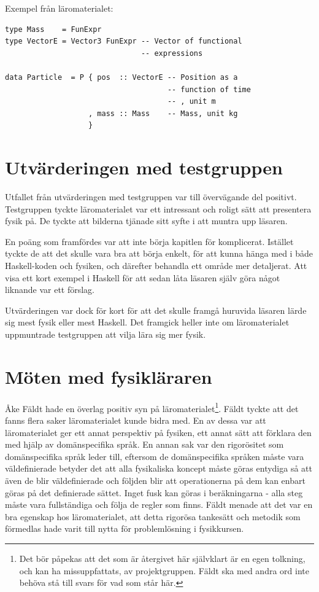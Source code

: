 Exempel från läromaterialet:
\begin{lstlisting}[frame=none, belowskip=-0.5\baselineskip, xleftmargin=0.5in]
type Mass    = FunExpr
type VectorE = Vector3 FunExpr -- Vector of functional
                               -- expressions

data Particle  = P { pos  :: VectorE -- Position as a
                                     -- function of time
                                     -- , unit m
                   , mass :: Mass    -- Mass, unit kg
                   }
\end{lstlisting}

\section{Utvärderingen med testgruppen}\label{sec:res_test}

Utfallet från utvärderingen med testgruppen var till övervägande del positivt.
Testgruppen tyckte läromaterialet var ett intressant och roligt sätt att
presentera fysik på. De tyckte att bilderna tjänade sitt syfte i att muntra upp
läsaren.

En poäng som framfördes var att inte börja kapitlen för komplicerat. Istället
tyckte de att det skulle vara bra att börja enkelt, för att kunna hänga med i
både Haskell-koden och fysiken, och därefter behandla ett område mer
detaljerat. Att visa ett kort exempel i Haskell för att sedan låta läsaren själv
göra något liknande var ett förslag.

Utvärderingen var dock för kort för att det skulle framgå huruvida läsaren lärde
sig mest fysik eller mest Haskell. Det framgick heller inte om läromaterialet
uppmuntrade testgruppen att vilja lära sig mer fysik.

\section{Möten med fysikläraren}\label{sec:res_ake}

Åke Fäldt hade en överlag positiv syn på läromaterialet\footnote{Det bör
påpekas att det som är återgivet här självklart är en egen tolkning, och kan ha
missuppfattats, av projektgruppen. Fäldt ska med andra ord inte behöva stå till
svars för vad som står här.}. Fäldt tyckte att det fanns flera saker
läromaterialet kunde bidra med. En av dessa var att läromaterialet ger ett annat
perspektiv på fysiken, ett annat sätt att förklara den med
hjälp av domänspecifika språk. En annan sak var den rigorösitet som
domänspecifika språk leder till, eftersom de domänspecifika språken måste vara
väldefinierade betyder det att alla fysikaliska koncept måste göras entydiga så
att även de blir väldefinierade och följden blir att operationerna på dem kan
enbart göras på det definierade sättet. Inget fusk kan göras i
beräkningarna - alla steg måste vara fullständiga och följa de regler som finns.
Fäldt menade att det var en bra egenskap hos läromaterialet, att detta rigorösa
tankesätt och metodik som förmedlas hade varit till nytta för problemlösning i
fysikkursen.

